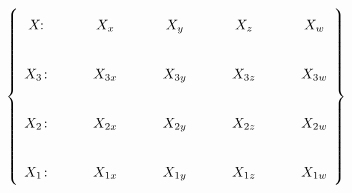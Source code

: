 \documentclass[border={0pt 0pt 0pt 0pt}]{standalone}
\begin{document}
$$
\left\{
\begin{tikzcd}
	{X\!\!:} & {X_x} & {X_y} & {X_z} & {X_w} \\
	{X_3\!:} & {X_{3x}} & {X_{3y}} & {X_{3z}} & {X_{3w}} \\
	{X_2\!:} & {X_{2x}} & {X_{2y}} & {X_{2z}} & {X_{2w}} \\
	{X_1\!:} & {X_{1x}} & {X_{1y}} & {X_{1z}} & {X_{1w}}
\end{tikzcd}
\right\}
$$
\end{document}
